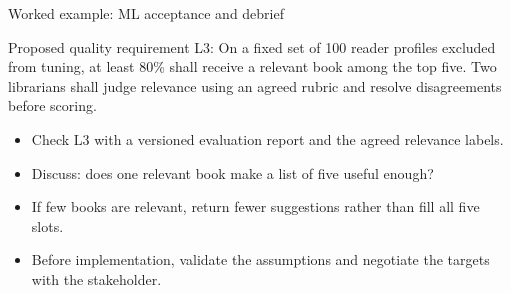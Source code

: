 \begin{frame}{Worked example: ML acceptance and debrief}
\begin{block}{Proposed quality requirement}
L3: On a fixed set of 100 reader profiles excluded from tuning, at least 80\% shall receive a relevant book among the top five. Two librarians shall judge relevance using an agreed rubric and resolve disagreements before scoring.
\end{block}
\begin{itemize}
\item Check L3 with a versioned evaluation report and the agreed relevance labels.
\item Discuss: does one relevant book make a list of five useful enough?
\item If few books are relevant, return fewer suggestions rather than fill all five slots.
\item Before implementation, validate the assumptions and negotiate the targets with the stakeholder.
\end{itemize}
\coursefooter
\end{frame}

\ifdefined\requirementspracticefragment\else

\fi

